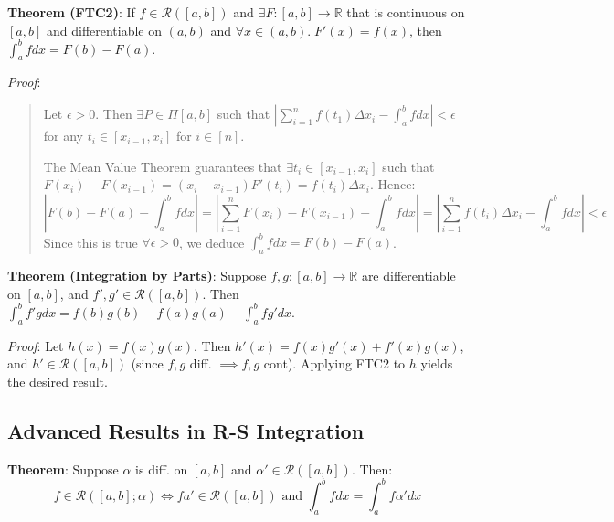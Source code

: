 \documentclass[11pt]{article}
\begin{document}
\textbf{Theorem (FTC2)}: If $f \in \mathcal{R}([a,b])$ and $\exists F : [a,b] \to \mathbb{R}$ that is continuous on $[a,b]$ and differentiable on $(a,b)$ and $\forall x \in (a,b).\; F'(x) = f(x)$, then $\int_a^b f dx = F(b) - F(a)$.

\emph{Proof}:
\begin{quote}\vspace{-0.3cm}
Let $\epsilon > 0$. Then $\exists P \in \Pi[a,b]$ such that $|\sum_{i=1}^n f(t_1) \Delta x_i - \int_a^b f dx| < \epsilon$ for any $t_i \in [x_{i-1}, x_i]$ for $i \in [n]$.

The Mean Value Theorem guarantees that $\exists t_i \in [x_{i-1}, x_i]$ such that $F(x_i) - F(x_{i-1}) = (x_i - x_{i-1}) F'(t_i) = f(t_i) \Delta x_i$. Hence:
\begin{displaymath}
\left|F(b) - F(a) - \int_a^b f dx\right| = \left|\sum_{i=1}^n F(x_i) - F(x_{i-1}) - \int_a^b f dx\right| = \left|\sum_{i=1}^n f(t_i) \Delta x_i - \int_a^b f dx\right| < \epsilon
\end{displaymath}
Since this is true $\forall \epsilon > 0$, we deduce $\int_a^b f dx = F(b) - F(a)$.
\end{quote}

\textbf{Theorem (Integration by Parts)}: Suppose $f, g : [a,b] \to \mathbb{R}$ are differentiable on $[a,b]$, and $f', g' \in \mathcal{R}([a,b])$. Then $\int_a^b f'g dx = f(b)g(b) - f(a)g(a) - \int_a^b fg' dx$.

\emph{Proof}: Let $h(x) = f(x)g(x)$. Then $h'(x) = f(x)g'(x) + f'(x)g(x)$, and $h' \in \mathcal{R}([a,b])$ (since $f,g$ diff. $\implies f,g$ cont). Applying FTC2 to $h$ yields the desired result.

\subsection{Advanced Results in R-S Integration}

\textbf{Theorem}: Suppose $\alpha$ is diff. on $[a,b]$ and $\alpha' \in \mathcal{R}([a,b])$. Then:
\begin{displaymath}
f \in \mathcal{R}([a,b]; \alpha) \iff fa' \in \mathcal{R}([a,b]) \text{ and } \int_a^b f dx = \int_a^b f \alpha' dx
\end{displaymath}
\end{document}

